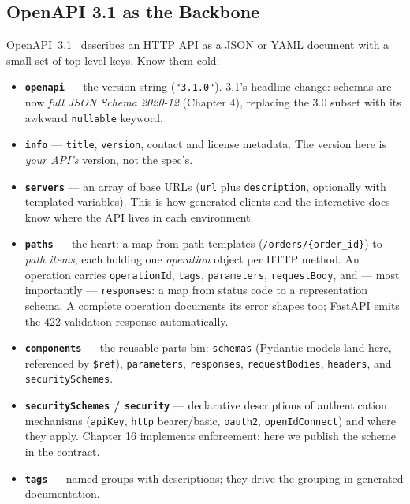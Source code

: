 \subsection{OpenAPI 3.1 as the Backbone}
\label{sec:ch6-openapi}

OpenAPI~3.1~\cite{openapi31} describes an HTTP API as a JSON or YAML document
with a small set of top-level keys. Know them cold:

\begin{itemize}
  \item \textbf{\texttt{openapi}} --- the version string (\texttt{"3.1.0"}).
        3.1's headline change: schemas are now \emph{full JSON Schema
        2020-12} (Chapter 4), replacing the 3.0 subset with its awkward
        \texttt{nullable} keyword.
  \item \textbf{\texttt{info}} --- \texttt{title}, \texttt{version}, contact
        and license metadata. The version here is \emph{your API's} version,
        not the spec's.
  \item \textbf{\texttt{servers}} --- an array of base URLs
        (\texttt{url} plus \texttt{description}, optionally with templated
        variables). This is how generated clients and the interactive docs
        know where the API lives in each environment.
  \item \textbf{\texttt{paths}} --- the heart: a map from path templates
        (\texttt{/orders/\{order\_id\}}) to \emph{path items}, each holding
        one \emph{operation} object per HTTP method. An operation carries
        \texttt{operationId}, \texttt{tags}, \texttt{parameters},
        \texttt{requestBody}, and --- most importantly --- \texttt{responses}:
        a map from status code to a representation schema. A complete
        operation documents its error shapes too; FastAPI emits the 422
        validation response automatically.
  \item \textbf{\texttt{components}} --- the reusable parts bin:
        \texttt{schemas} (Pydantic models land here, referenced by
        \texttt{\$ref}), \texttt{parameters}, \texttt{responses},
        \texttt{requestBodies}, \texttt{headers}, and
        \texttt{securitySchemes}.
  \item \textbf{\texttt{securitySchemes} / \texttt{security}} --- declarative
        descriptions of authentication mechanisms (\texttt{apiKey},
        \texttt{http} bearer/basic, \texttt{oauth2}, \texttt{openIdConnect})
        and where they apply. Chapter 16 implements enforcement; here we
        publish the scheme in the contract.
  \item \textbf{\texttt{tags}} --- named groups with descriptions; they drive
        the grouping in generated documentation.
\end{itemize}

